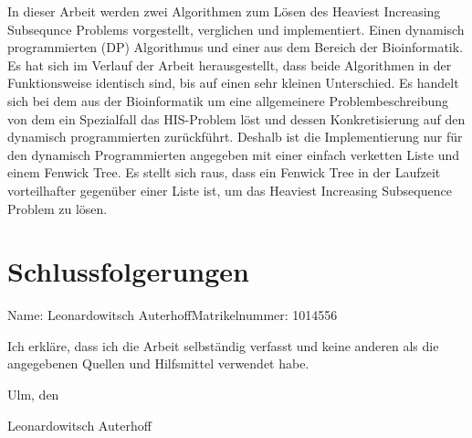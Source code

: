 \documentclass[a4paper,12pt,headsepline,oneside]{scrbook}
\newenvironment{abstract}{}{}
\newcommand{\fullname}{Leonardowitsch Auterhoff}
\newcommand{\matnr}{1014556}
\begin{document}
\tableofcontents


\begin{abstract}
   In dieser Arbeit werden zwei Algorithmen zum Lösen des Heaviest Increasing Subsequnce Problems vorgestellt, verglichen und implementiert. Einen dynamisch programmierten (DP) Algorithmus und einer aus dem Bereich der Bioinformatik. Es hat sich im Verlauf der Arbeit herausgestellt, dass beide Algorithmen in der Funktionsweise identisch sind, bis auf einen sehr kleinen Unterschied. Es handelt sich bei dem aus der Bioinformatik um eine allgemeinere Problembeschreibung von dem ein Spezialfall das HIS-Problem löst und dessen Konkretisierung auf den dynamisch programmierten zurückführt. Deshalb ist die Implementierung nur für den dynamisch Programmierten angegeben mit einer einfach verketten Liste und einem Fenwick Tree. Es stellt sich raus, dass ein Fenwick Tree in der Laufzeit vorteilhafter gegenüber einer Liste ist, um das Heaviest Increasing Subsequence Problem zu lösen.
\end{abstract}















\section{Schlussfolgerungen}


\printbibliography
\newpage


\clearpage
\thispagestyle{empty}

Name: \fullname \hfill Matrikelnummer: \matnr \vspace{2cm}


Ich erkläre, dass ich die Arbeit selbständig verfasst und keine anderen als die angegebenen Quellen und Hilfsmittel verwendet habe.\vspace{2cm}

Ulm, den \dotfill

\hspace{10cm} {\footnotesize \fullname}
\end{document}
